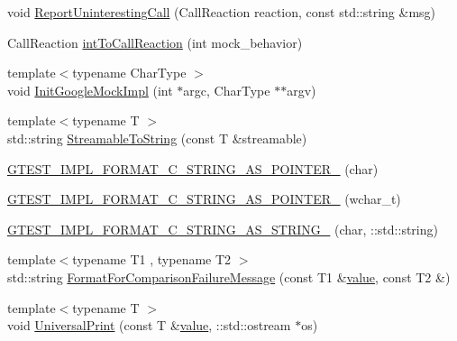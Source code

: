 \begin{DoxyCompactItemize}
\item 
void \mbox{\hyperlink{namespacetesting_1_1internal_af045b703d8487374620a8106a76814ee}{Report\+Uninteresting\+Call}} (Call\+Reaction reaction, const std\+::string \&msg)
\item 
Call\+Reaction \mbox{\hyperlink{namespacetesting_1_1internal_a55ce2ee38c64db1a89feae3751439620}{int\+To\+Call\+Reaction}} (int mock\+\_\+behavior)
\item 
{\footnotesize template$<$typename Char\+Type $>$ }\\void \mbox{\hyperlink{namespacetesting_1_1internal_a3823844199df88af9493026031cf7744}{Init\+Google\+Mock\+Impl}} (int $\ast$argc, Char\+Type $\ast$$\ast$argv)
\item 
{\footnotesize template$<$typename T $>$ }\\std\+::string \mbox{\hyperlink{namespacetesting_1_1internal_aad4beed95d0846e6ffc5da0978ef3bb9}{Streamable\+To\+String}} (const T \&streamable)
\item 
\mbox{\hyperlink{namespacetesting_1_1internal_a3682f962ae0ec1c0eca6444ca0a09e91}{G\+T\+E\+S\+T\+\_\+\+I\+M\+P\+L\+\_\+\+F\+O\+R\+M\+A\+T\+\_\+\+C\+\_\+\+S\+T\+R\+I\+N\+G\+\_\+\+A\+S\+\_\+\+P\+O\+I\+N\+T\+E\+R\+\_\+}} (char)
\item 
\mbox{\hyperlink{namespacetesting_1_1internal_a85e08f00d443221e529a0a85a90fbaeb}{G\+T\+E\+S\+T\+\_\+\+I\+M\+P\+L\+\_\+\+F\+O\+R\+M\+A\+T\+\_\+\+C\+\_\+\+S\+T\+R\+I\+N\+G\+\_\+\+A\+S\+\_\+\+P\+O\+I\+N\+T\+E\+R\+\_\+}} (wchar\+\_\+t)
\item 
\mbox{\hyperlink{namespacetesting_1_1internal_aeac30230dcc362221bdd07d61eaa4ec1}{G\+T\+E\+S\+T\+\_\+\+I\+M\+P\+L\+\_\+\+F\+O\+R\+M\+A\+T\+\_\+\+C\+\_\+\+S\+T\+R\+I\+N\+G\+\_\+\+A\+S\+\_\+\+S\+T\+R\+I\+N\+G\+\_\+}} (char, \+::std\+::string)
\item 
{\footnotesize template$<$typename T1 , typename T2 $>$ }\\std\+::string \mbox{\hyperlink{namespacetesting_1_1internal_a91ab078f10adc669f09b7f604975c518}{Format\+For\+Comparison\+Failure\+Message}} (const T1 \&\mbox{\hyperlink{_obj__test_2lib_2googletest-master_2googlemock_2test_2gmock-matchers__test_8cc_a337b8a670efc0b086ad3af163f3121b6}{value}}, const T2 \&)
\item 
{\footnotesize template$<$typename T $>$ }\\void \mbox{\hyperlink{namespacetesting_1_1internal_a30708fa2bacf11895b03bdb21eb72309}{Universal\+Print}} (const T \&\mbox{\hyperlink{_obj__test_2lib_2googletest-master_2googlemock_2test_2gmock-matchers__test_8cc_a337b8a670efc0b086ad3af163f3121b6}{value}}, \+::std\+::ostream $\ast$os)
$$
\end{DoxyCompactItemize}
